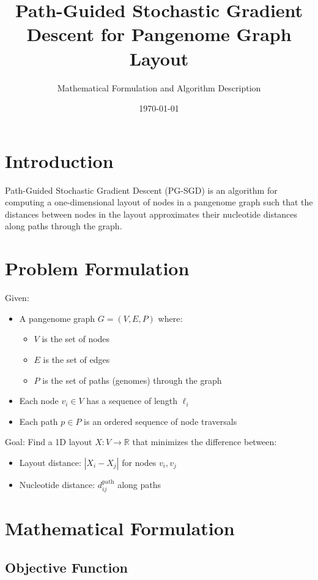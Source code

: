 \documentclass{article}
\title{Path-Guided Stochastic Gradient Descent for Pangenome Graph Layout}
\author{Mathematical Formulation and Algorithm Description}
\date{\today}
\begin{document}
\maketitle

\section{Introduction}

Path-Guided Stochastic Gradient Descent (PG-SGD) is an algorithm for computing a one-dimensional layout of nodes in a pangenome graph such that the distances between nodes in the layout approximates their nucleotide distances along paths through the graph.

\section{Problem Formulation}

Given:
\begin{itemize}
    \item A pangenome graph $G = (V, E, P)$ where:
    \begin{itemize}
        \item $V$ is the set of nodes
        \item $E$ is the set of edges
        \item $P$ is the set of paths (genomes) through the graph
    \end{itemize}
    \item Each node $v_i \in V$ has a sequence of length $\ell_i$
    \item Each path $p \in P$ is an ordered sequence of node traversals
\end{itemize}

Goal: Find a 1D layout $X: V \rightarrow \mathbb{R}$ that minimizes the difference between:
\begin{itemize}
    \item Layout distance: $|X_i - X_j|$ for nodes $v_i, v_j$
    \item Nucleotide distance: $d_{ij}^{\text{path}}$ along paths
\end{itemize}

\section{Mathematical Formulation}

\subsection{Objective Function}
\end{document}
